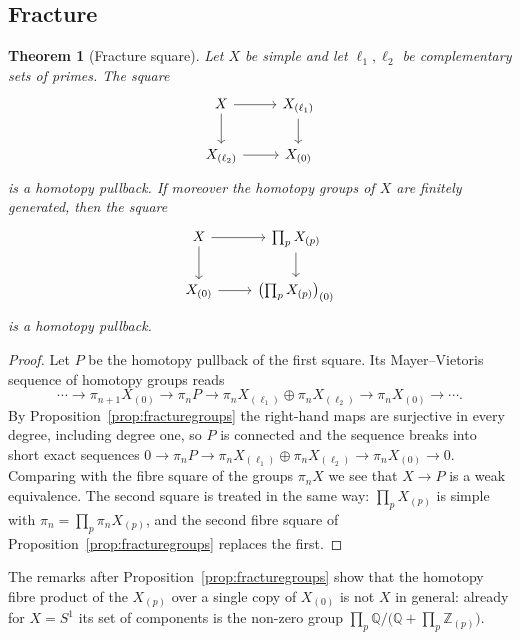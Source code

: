 \documentclass[11pt]{amsart}
\theoremstyle{plain}
\newtheorem{theorem}{Theorem}[section]
\theoremstyle{definition}
\numberwithin{equation}{section}
\newcommand{\Q}{\mathbb{Q}}
\newcommand{\Zp}{\mathbb{Z}_{(p)}}
\begin{document}
\subsection{Fracture}

\begin{theorem}[Fracture square]\label{thm:fracture}
Let $X$ be simple and let $\ell_1,\ell_2$ be complementary sets of primes.
The square
\[
\begin{tikzcd}
X\arrow[r]\arrow[d] & X_{(\ell_1)}\arrow[d]\\
X_{(\ell_2)}\arrow[r] & X_{(0)}
\end{tikzcd}
\]
is a homotopy pullback.
If moreover the homotopy groups of $X$ are finitely generated, then the square
\[
\begin{tikzcd}
X\arrow[r]\arrow[d] & \prod_pX_{(p)}\arrow[d]\\
X_{(0)}\arrow[r] & \bigl(\prod_pX_{(p)}\bigr)_{(0)}
\end{tikzcd}
\]
is a homotopy pullback.
\end{theorem}

\begin{proof}
Let $P$ be the homotopy pullback of the first square.
Its Mayer--Vietoris sequence of homotopy groups reads
\[
\cdots\to\pi_{n+1}X_{(0)}\to\pi_nP\to\pi_nX_{(\ell_1)}\oplus\pi_nX_{(\ell_2)}\to\pi_nX_{(0)}\to\cdots .
\]
By Proposition~\ref{prop:fracturegroups} the right-hand maps are surjective in every degree, including degree one, so $P$ is connected and the sequence breaks into short exact sequences $0\to\pi_nP\to\pi_nX_{(\ell_1)}\oplus\pi_nX_{(\ell_2)}\to\pi_nX_{(0)}\to0$.
Comparing with the fibre square of the groups $\pi_nX$ we see that $X\to P$ is a weak equivalence.
The second square is treated in the same way: $\prod_pX_{(p)}$ is simple with $\pi_n=\prod_p\pi_nX_{(p)}$, and the second fibre square of Proposition~\ref{prop:fracturegroups} replaces the first.
\end{proof}

The remarks after Proposition~\ref{prop:fracturegroups} show that the homotopy fibre product of the $X_{(p)}$ over a single copy of $X_{(0)}$ is not $X$ in general: already for $X=S^1$ its set of components is the non-zero group $\prod_p\Q/\bigl(\Q+\prod_p\Zp\bigr)$.
\end{document}
